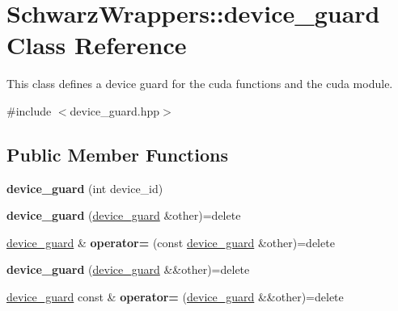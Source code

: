 \hypertarget{classSchwarzWrappers_1_1device__guard}{}\section{Schwarz\+Wrappers\+:\+:device\+\_\+guard Class Reference}
\label{classSchwarzWrappers_1_1device__guard}


This class defines a device guard for the cuda functions and the cuda module.  




{\ttfamily \#include $<$device\+\_\+guard.\+hpp$>$}

\subsection*{Public Member Functions}
\begin{DoxyCompactItemize}
\item 
\mbox{\label{classSchwarzWrappers_1_1device__guard_a60864036f9a87a6bc589a216a6ac5393}} 
{\bfseries device\+\_\+guard} (int device\+\_\+id)
\item 
\mbox{\label{classSchwarzWrappers_1_1device__guard_abd8b3984d04ba1185ca2ed84056b0de6}} 
{\bfseries device\+\_\+guard} (\hyperlink{classSchwarzWrappers_1_1device__guard}{device\+\_\+guard} \&other)=delete
\item 
\mbox{\label{classSchwarzWrappers_1_1device__guard_a53abfe6522fc0df4c486c1b8828a5473}} 
\hyperlink{classSchwarzWrappers_1_1device__guard}{device\+\_\+guard} \& {\bfseries operator=} (const \hyperlink{classSchwarzWrappers_1_1device__guard}{device\+\_\+guard} \&other)=delete
\item 
\mbox{\label{classSchwarzWrappers_1_1device__guard_a087728bfdf633becaced536080d5f668}} 
{\bfseries device\+\_\+guard} (\hyperlink{classSchwarzWrappers_1_1device__guard}{device\+\_\+guard} \&\&other)=delete
\item 
\mbox{\label{classSchwarzWrappers_1_1device__guard_a38c35992c7cbf3e67033cf26daf24c10}} 
\hyperlink{classSchwarzWrappers_1_1device__guard}{device\+\_\+guard} const  \& {\bfseries operator=} (\hyperlink{classSchwarzWrappers_1_1device__guard}{device\+\_\+guard} \&\&other)=delete
\end{DoxyCompactItemize}


